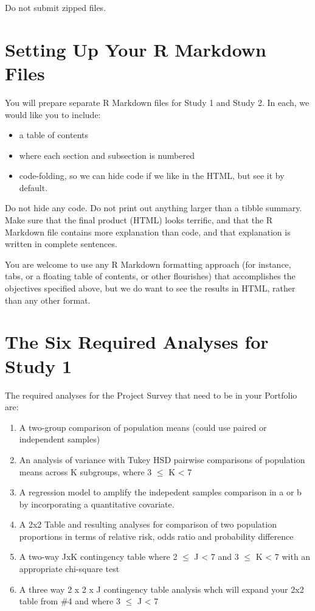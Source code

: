 \documentclass[]{book}
\providecommand{\tightlist}{%
  \setlength{\itemsep}{0pt}\setlength{\parskip}{0pt}}
\theoremstyle{definition}
\theoremstyle{definition}
\theoremstyle{definition}
\theoremstyle{remark}
\begin{document}
Do not submit zipped files.

\hypertarget{setting-up-your-r-markdown-files}{%
\section{Setting Up Your R Markdown
Files}\label{setting-up-your-r-markdown-files}}

You will prepare separate R Markdown files for Study 1 and Study 2. In
each, we would like you to include:

\begin{itemize}
\tightlist
\item
  a table of contents
\item
  where each section and subsection is numbered
\item
  code-folding, so we can hide code if we like in the HTML, but see it
  by default.
\end{itemize}

Do not hide any code. Do not print out anything larger than a tibble
summary. Make sure that the final product (HTML) looks terrific, and
that the R Markdown file contains more explanation than code, and that
explanation is written in complete sentences.

You are welcome to use any R Markdown formatting approach (for instance,
tabs, or a floating table of contents, or other flourishes) that
accomplishes the objectives specified above, but we do want to see the
results in HTML, rather than any other format.

\hypertarget{the-six-required-analyses-for-study-1-1}{%
\section{The Six Required Analyses for Study
1}\label{the-six-required-analyses-for-study-1-1}}

The required analyses for the Project Survey that need to be in your
Portfolio are:

\begin{enumerate}
\def\labelenumi{\arabic{enumi}.}
\tightlist
\item
  A two-group comparison of population means (could use paired or
  independent samples)
\item
  An analysis of variance with Tukey HSD pairwise comparisons of
  population means across K subgroups, where 3 \(\leq\) K \textless{} 7
\item
  A regression model to amplify the indepedent samples comparison in a
  or b by incorporating a quantitative covariate.
\item
  A 2x2 Table and resulting analyses for comparison of two population
  proportions in terms of relative risk, odds ratio and probability
  difference
\item
  A two-way JxK contingency table where 2 \(\leq\) J \textless{} 7 and 3
  \(\leq\) K \textless{} 7 with an appropriate chi-square test
\item
  A three way 2 x 2 x J contingency table analysis whch will expand your
  2x2 table from \#4 and where 3 \(\leq\) J \textless{} 7
\end{enumerate}
\end{document}
